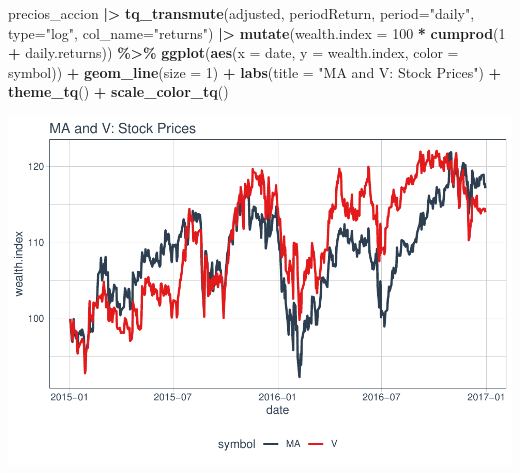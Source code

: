 \documentclass[
]{book}
\newenvironment{Shaded}{\begin{snugshade}}{\end{snugshade}}
\newcommand{\AttributeTok}[1]{\textcolor[rgb]{0.13,0.29,0.53}{#1}}
\newcommand{\DecValTok}[1]{\textcolor[rgb]{0.00,0.00,0.81}{#1}}
\newcommand{\FunctionTok}[1]{\textcolor[rgb]{0.13,0.29,0.53}{\textbf{#1}}}
\newcommand{\NormalTok}[1]{#1}
\newcommand{\SpecialCharTok}[1]{\textcolor[rgb]{0.81,0.36,0.00}{\textbf{#1}}}
\newcommand{\StringTok}[1]{\textcolor[rgb]{0.31,0.60,0.02}{#1}}
\begin{document}
\begin{Shaded}
\begin{Highlighting}[]
\NormalTok{precios\_accion }\SpecialCharTok{|\textgreater{}} \FunctionTok{tq\_transmute}\NormalTok{(adjusted,}
\NormalTok{                               periodReturn,}
                               \AttributeTok{period=}\StringTok{"daily"}\NormalTok{,}
                               \AttributeTok{type=}\StringTok{"log"}\NormalTok{,}
                               \AttributeTok{col\_name=}\StringTok{"returns"}\NormalTok{) }\SpecialCharTok{|\textgreater{}} 
                   \FunctionTok{mutate}\NormalTok{(}\AttributeTok{wealth.index =} \DecValTok{100} \SpecialCharTok{*} \FunctionTok{cumprod}\NormalTok{(}\DecValTok{1} \SpecialCharTok{+}\NormalTok{ daily.returns)) }\SpecialCharTok{\%\textgreater{}\%}
                   \FunctionTok{ggplot}\NormalTok{(}\FunctionTok{aes}\NormalTok{(}\AttributeTok{x =}\NormalTok{ date, }\AttributeTok{y =}\NormalTok{ wealth.index, }\AttributeTok{color =}\NormalTok{ symbol)) }\SpecialCharTok{+}
                   \FunctionTok{geom\_line}\NormalTok{(}\AttributeTok{size =} \DecValTok{1}\NormalTok{) }\SpecialCharTok{+}
                   \FunctionTok{labs}\NormalTok{(}\AttributeTok{title =} \StringTok{"MA and V: Stock Prices"}\NormalTok{) }\SpecialCharTok{+}
                   \FunctionTok{theme\_tq}\NormalTok{() }\SpecialCharTok{+} 
                   \FunctionTok{scale\_color\_tq}\NormalTok{()}
\end{Highlighting}
\end{Shaded}

\includegraphics{Libro_TidyQualityTools_files/figure-latex/unnamed-chunk-76-1.pdf}
\end{document}
